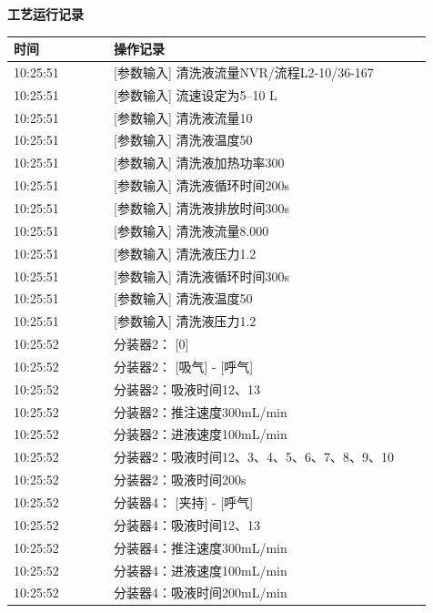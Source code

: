 \documentclass[UTF8,10pt,a4paper,fontset=fandol]{ctexart}
\begin{document}
\begin{minipage}[t]{0.47\linewidth}
\scriptsize
\textbf{工艺运行记录}

\begin{tabular}{|p{0.22\linewidth}|p{0.70\linewidth}|}
\hline
时间 & 操作记录 \\ \hline
10:25:51 & [参数输入] 清洗液流量NVR/流程L2-10/36-167 \\ \hline
10:25:51 & [参数输入] 流速设定为5--10 L \\ \hline
10:25:51 & [参数输入] 清洗液流量10 \\ \hline
10:25:51 & [参数输入] 清洗液温度50 \\ \hline
10:25:51 & [参数输入] 清洗液加热功率300 \\ \hline
10:25:51 & [参数输入] 清洗液循环时间200s \\ \hline
10:25:51 & [参数输入] 清洗液排放时间300s \\ \hline
10:25:51 & [参数输入] 清洗液流量8.000 \\ \hline
10:25:51 & [参数输入] 清洗液压力1.2 \\ \hline
10:25:51 & [参数输入] 清洗液循环时间300s \\ \hline
10:25:51 & [参数输入] 清洗液温度50 \\ \hline
10:25:51 & [参数输入] 清洗液压力1.2 \\ \hline
10:25:52 & 分装器2： [0] \\ \hline
10:25:52 & 分装器2： [吸气] - [呼气] \\ \hline
10:25:52 & 分装器2：吸液时间12、13 \\ \hline
10:25:52 & 分装器2：推注速度300mL/min \\ \hline
10:25:52 & 分装器2：进液速度100mL/min \\ \hline
10:25:52 & 分装器2：吸液时间12、3、4、5、6、7、8、9、10 \\ \hline
10:25:52 & 分装器2：吸液时间200s \\ \hline
10:25:52 & 分装器4： [夹持] - [呼气] \\ \hline
10:25:52 & 分装器4：吸液时间12、13 \\ \hline
10:25:52 & 分装器4：推注速度300mL/min \\ \hline
10:25:52 & 分装器4：进液速度100mL/min \\ \hline
10:25:52 & 分装器4：吸液时间200mL/min \\ \hline
\end{tabular}
\end{minipage}

\vspace{8mm}
\end{document}
